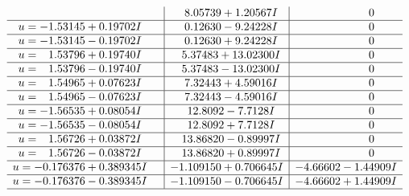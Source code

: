 \documentclass[1p]{elsarticle_modified}
\theoremstyle{definition}
\begin{document}
$$\begin{array}{c|c|c}
 & \phantom{-}8.05739 + 1.20567 I & \phantom{-0.000000 } 0 \\ \hline\begin{aligned}
u &= -1.53145 + 0.19702 I\end{aligned}
 & \phantom{-}0.12630 - 9.24228 I & \phantom{-0.000000 } 0 \\ \hline\begin{aligned}
u &= -1.53145 - 0.19702 I\end{aligned}
 & \phantom{-}0.12630 + 9.24228 I & \phantom{-0.000000 } 0 \\ \hline\begin{aligned}
u &= \phantom{-}1.53796 + 0.19740 I\end{aligned}
 & \phantom{-}5.37483 + 13.02300 I & \phantom{-0.000000 } 0 \\ \hline\begin{aligned}
u &= \phantom{-}1.53796 - 0.19740 I\end{aligned}
 & \phantom{-}5.37483 - 13.02300 I & \phantom{-0.000000 } 0 \\ \hline\begin{aligned}
u &= \phantom{-}1.54965 + 0.07623 I\end{aligned}
 & \phantom{-}7.32443 + 4.59016 I & \phantom{-0.000000 } 0 \\ \hline\begin{aligned}
u &= \phantom{-}1.54965 - 0.07623 I\end{aligned}
 & \phantom{-}7.32443 - 4.59016 I & \phantom{-0.000000 } 0 \\ \hline\begin{aligned}
u &= -1.56535 + 0.08054 I\end{aligned}
 & \phantom{-}12.8092 - 7.7128 I & \phantom{-0.000000 } 0 \\ \hline\begin{aligned}
u &= -1.56535 - 0.08054 I\end{aligned}
 & \phantom{-}12.8092 + 7.7128 I & \phantom{-0.000000 } 0 \\ \hline\begin{aligned}
u &= \phantom{-}1.56726 + 0.03872 I\end{aligned}
 & \phantom{-}13.86820 - 0.89997 I & \phantom{-0.000000 } 0 \\ \hline\begin{aligned}
u &= \phantom{-}1.56726 - 0.03872 I\end{aligned}
 & \phantom{-}13.86820 + 0.89997 I & \phantom{-0.000000 } 0 \\ \hline\begin{aligned}
u &= -0.176376 + 0.389345 I\end{aligned}
 & -1.109150 + 0.706645 I & -4.66602 - 1.44909 I \\ \hline\begin{aligned}
u &= -0.176376 - 0.389345 I\end{aligned}
 & -1.109150 - 0.706645 I & -4.66602 + 1.44909 I\\
 \hline 
 \end{array}$$\newpage
\end{document}
